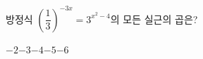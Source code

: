 방정식 $\left(\dfrac{1}{3}\right)^{-3x}=3^{x^2-4}$의 모든 실근의 곱은?
\begin{choices32}{$-2$}{$-3$}{$-4$}{$-5$}{$-6$}\end{choices32}

